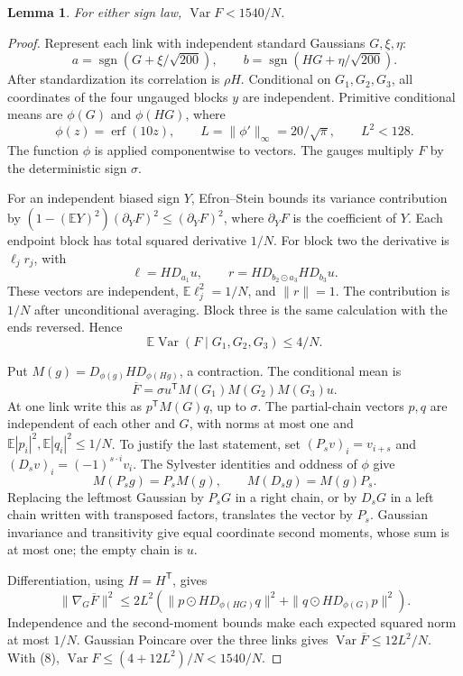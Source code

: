 \documentclass[11pt]{article}
\newtheorem{lemma}[theorem]{Lemma}
\newcommand{\E}{\mathbb E}
\newcommand{\Var}{\operatorname{Var}}
\newcommand{\sgn}{\operatorname{sgn}}
\begin{document}
\begin{lemma}\label{lem:variance}
For either sign law, $\Var F<1540/N$.
\end{lemma}
\begin{proof}
Represent each link with independent standard Gaussians $G,\xi,\eta$:
\[
 a=\sgn(G+\xi/\sqrt{200}),\qquad
 b=\sgn(HG+\eta/\sqrt{200}).
\]
After standardization its correlation is $\rho H$.
Conditional on $G_1,G_2,G_3$, all coordinates of the four ungauged
blocks $y$ are independent. Primitive conditional means are
$\phi(G)$ and $\phi(HG)$, where
\[
 \phi(z)=\operatorname{erf}(10z),\qquad
 L=\|\phi'\|_\infty=20/\sqrt\pi,\qquad L^2<128.
\]
The function $\phi$ is applied componentwise to vectors.
The gauges multiply $F$ by the deterministic sign $\sigma$.

For an independent biased sign $Y$, Efron--Stein bounds its variance
contribution by
$(1-(\E Y)^2)(\partial_YF)^2\le(\partial_YF)^2$,
where $\partial_YF$ is the coefficient of $Y$.
Each endpoint block has total squared derivative $1/N$.
For block two the derivative is $\ell_jr_j$, with
\[
 \ell=HD_{a_1}u,\qquad
 r=HD_{b_2\odot a_3}HD_{b_3}u.
\]
These vectors are independent, $\E\ell_j^2=1/N$, and $\|r\|=1$.
The contribution is $1/N$ after unconditional averaging.
Block three is the same calculation with the ends reversed. Hence
\[
                  \E\Var(F\mid G_1,G_2,G_3)\le4/N.
 \tag{8}
\]

Put $M(g)=D_{\phi(g)}HD_{\phi(Hg)}$, a contraction. The conditional
mean is
\[
 \overline F=\sigma u^{\mathsf T}M(G_1)M(G_2)M(G_3)u.
\]
At one link write this as $p^{\mathsf T}M(G)q$, up to $\sigma$.
The partial-chain vectors $p,q$ are independent of each other and
$G$, with norms at most one and
$\E|p_i|^2,\E|q_i|^2\le1/N$.
To justify the last statement, set
$(P_sv)_i=v_{i+s}$ and $(D_sv)_i=(-1)^{s\cdot i}v_i$.
The Sylvester identities and oddness of $\phi$ give
\[
 M(P_sg)=P_sM(g),\qquad M(D_sg)=M(g)P_s.
\]
Replacing the leftmost Gaussian by $P_sG$ in a right chain, or by $D_sG$
in a left chain written with transposed factors, translates the vector
by $P_s$. Gaussian invariance and transitivity give equal coordinate
second moments, whose sum is at most one; the empty chain is $u$.

Differentiation, using $H=H^{\mathsf T}$, gives
\[
 \|\nabla_G\overline F\|^2\le2L^2\left(
 \|p\odot HD_{\phi(HG)}q\|^2+
 \|q\odot HD_{\phi(G)}p\|^2\right).
\]
Independence and the second-moment bounds make each expected squared
norm at most $1/N$. Gaussian Poincare over the three links gives
$\Var\overline F\le12L^2/N$. With (8),
$\Var F\le(4+12L^2)/N<1540/N$.
\end{proof}
\end{document}
